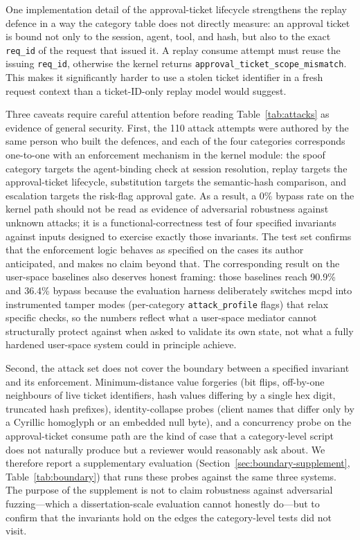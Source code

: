One implementation detail of the approval-ticket lifecycle strengthens the replay defence in a way the category table does not directly measure: an approval ticket is bound not only to the session, agent, tool, and hash, but also to the exact \texttt{req\_id} of the request that issued it. A replay consume attempt must reuse the issuing \texttt{req\_id}, otherwise the kernel returns \texttt{approval\_ticket\_scope\_mismatch}. This makes it significantly harder to use a stolen ticket identifier in a fresh request context than a ticket-ID-only replay model would suggest.

Three caveats require careful attention before reading Table~\ref{tab:attacks} as evidence of general security.
First, the 110 attack attempts were authored by the same person who built the defences, and each of the four categories corresponds one-to-one with an enforcement mechanism in the kernel module: the spoof category targets the agent-binding check at session resolution, replay targets the approval-ticket lifecycle, substitution targets the semantic-hash comparison, and escalation targets the risk-flag approval gate.
As a result, a 0\% bypass rate on the kernel path should not be read as evidence of adversarial robustness against unknown attacks; it is a functional-correctness test of four specified invariants against inputs designed to exercise exactly those invariants.
The test set confirms that the enforcement logic behaves as specified on the cases its author anticipated, and makes no claim beyond that.
The corresponding result on the user-space baselines also deserves honest framing: those baselines reach 90.9\% and 36.4\% bypass because the evaluation harness deliberately switches mcpd into instrumented tamper modes (per-category \texttt{attack\_profile} flags) that relax specific checks, so the numbers reflect what a user-space mediator cannot structurally protect against when asked to validate its own state, not what a fully hardened user-space system could in principle achieve.

Second, the attack set does not cover the boundary between a specified invariant and its enforcement. Minimum-distance value forgeries (bit flips, off-by-one neighbours of live ticket identifiers, hash values differing by a single hex digit, truncated hash prefixes), identity-collapse probes (client names that differ only by a Cyrillic homoglyph or an embedded null byte), and a concurrency probe on the approval-ticket consume path are the kind of case that a category-level script does not naturally produce but a reviewer would reasonably ask about. We therefore report a supplementary evaluation (Section~\ref{sec:boundary-supplement}, Table~\ref{tab:boundary}) that runs these probes against the same three systems. The purpose of the supplement is not to claim robustness against adversarial fuzzing---which a dissertation-scale evaluation cannot honestly do---but to confirm that the invariants hold on the edges the category-level tests did not visit.


